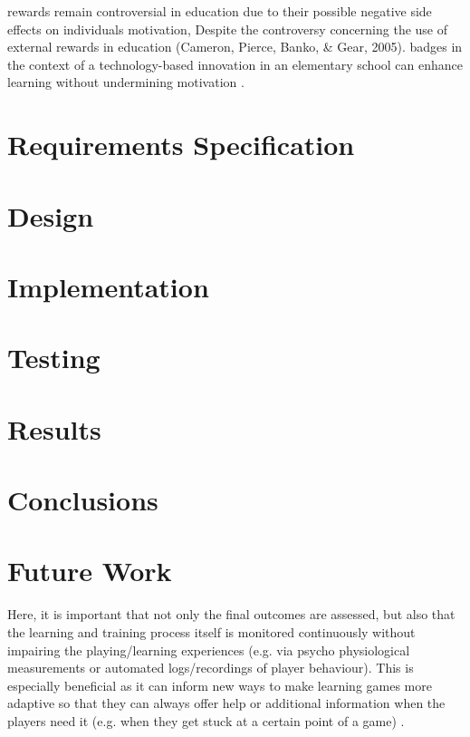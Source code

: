 \documentclass[a4paper,11.5pt]{report}
\numberwithin{figure}{section}
\numberwithin{table}{section}
\numberwithin{equation}{section}
\numberwithin{equation}{section}
\newcommand\blankpage{%
    \null
    \thispagestyle{empty}%
    \addtocounter{page}{-1}%
    \newpage}
\begin{document}
rewards remain controversial in education due to their possible negative side effects on individuals motivation, Despite the controversy concerning the use of external rewards in education (Cameron, Pierce, Banko, \& Gear, 2005). badges in the context of a technology-based innovation in an elementary school can enhance learning without undermining motivation \citep{Filsecker2014}.
 
 


\afterpage{\blankpage}

\chapter{Requirements Specification}
\afterpage{\blankpage}

\chapter{Design}
\afterpage{\blankpage}

\chapter{Implementation}
\afterpage{\blankpage}

\chapter{Testing}
\afterpage{\blankpage}

\chapter{Results}
\afterpage{\blankpage}

\chapter{Conclusions}
\afterpage{\blankpage}

\chapter{Future Work}

Here, it is important that not only the final outcomes are assessed, but also that the learning and training process itself is monitored continuously without impairing the playing/learning experiences (e.g. via psycho physiological measurements or automated logs/recordings of player behaviour). This is especially beneficial as it can inform new ways to make learning games more adaptive so that they can always offer help or additional information when the players need it (e.g. when they get stuck at a certain point of a game) \citep{Breuer2010}.
\end{document}
